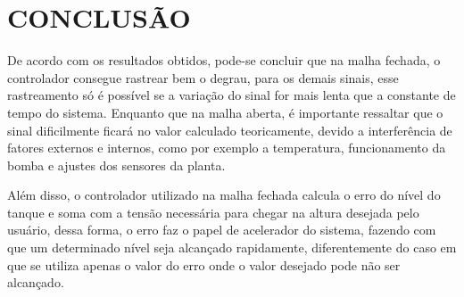 \documentclass[a4paper,12pt]{article}
\begin{document}
\newpage


\thispagestyle{main}

\section{CONCLUSÃO}


\hspace{4ex}De acordo com os resultados obtidos, pode-se concluir que na malha fechada, o controlador consegue rastrear bem o degrau, para os demais sinais, esse rastreamento só é possível se a variação do sinal for mais lenta que a constante de tempo do sistema. Enquanto que na malha aberta, é importante ressaltar que o sinal dificilmente ficará no valor calculado teoricamente, devido a interferência de fatores externos e internos, como por exemplo a temperatura, funcionamento da bomba e ajustes dos sensores da planta.

Além disso, o controlador utilizado na malha fechada calcula o erro do nível do tanque e soma com a tensão necessária para chegar na altura desejada pelo usuário, dessa forma, o erro faz o papel de acelerador do sistema, fazendo com que um determinado nível seja alcançado rapidamente, diferentemente do caso em que se utiliza apenas o valor do erro onde o valor desejado pode não ser alcançado.

\newpage




\appendix


\end{document}
